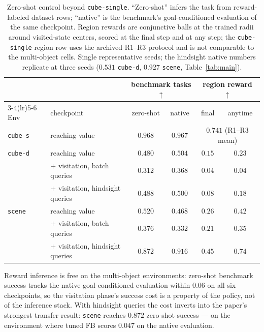 \documentclass{article}
\begin{document}
\begin{table}[t]
\centering\small
\begin{tabular}{l l cc cc}
\toprule
& & \multicolumn{2}{c}{benchmark tasks $\uparrow$} &
    \multicolumn{2}{c}{region reward $\uparrow$} \\
\cmidrule(lr){3-4}\cmidrule(lr){5-6}
Env & checkpoint & zero-shot & native & final & anytime \\
\midrule
\texttt{cube-s} & reaching value & $0.968$ & $0.967$ &
  \multicolumn{2}{c}{$0.741$ (R1--R3 mean)} \\
\midrule
\texttt{cube-d} & reaching value & $0.480$ & $0.504$ & $0.15$ & $0.23$ \\
& $+$ visitation, batch queries     & $0.312$ & $0.368$ & $0.04$ & $0.04$ \\
& $+$ visitation, hindsight queries & $0.488$ & $0.500$ & $0.08$ & $0.18$ \\
\midrule
\texttt{scene} & reaching value & $0.520$ & $0.468$ & $0.26$ & $0.42$ \\
& $+$ visitation, batch queries     & $0.376$ & $0.332$ & $0.21$ & $0.35$ \\
& $+$ visitation, hindsight queries & $\mathbf{0.872}$ & $0.916$ &
  $\mathbf{0.45}$ & $\mathbf{0.74}$ \\
\bottomrule
\end{tabular}
\caption{Zero-shot control beyond \texttt{cube-single}. ``Zero-shot'' infers
the task from reward-labeled dataset rows; ``native'' is the benchmark's
goal-conditioned evaluation of the same checkpoint. Region rewards are
conjunctive balls at the trained radii around visited-state centers, scored at
the final step and at any step; the \texttt{cube-single} region row uses the
archived R1--R3 protocol and is not comparable to the multi-object cells.
Single representative seeds; the hindsight native numbers replicate at three
seeds ($0.531$ \texttt{cube-d}, $0.927$ \texttt{scene},
Table~\ref{tab:main}).}
\label{tab:multienv-zeroshot}
\end{table}

\begin{finding}
Reward inference is free on the multi-object environments: zero-shot benchmark
success tracks the native goal-conditioned evaluation within $0.06$ on all six
checkpoints, so the visitation phase's success cost is a property of the
policy, not of the inference stack. With hindsight queries the cost inverts
into the paper's strongest transfer result: \texttt{scene} reaches $0.872$
zero-shot success --- on the environment where tuned FB scores $0.047$ on the
native evaluation.
\end{finding}
\end{document}
